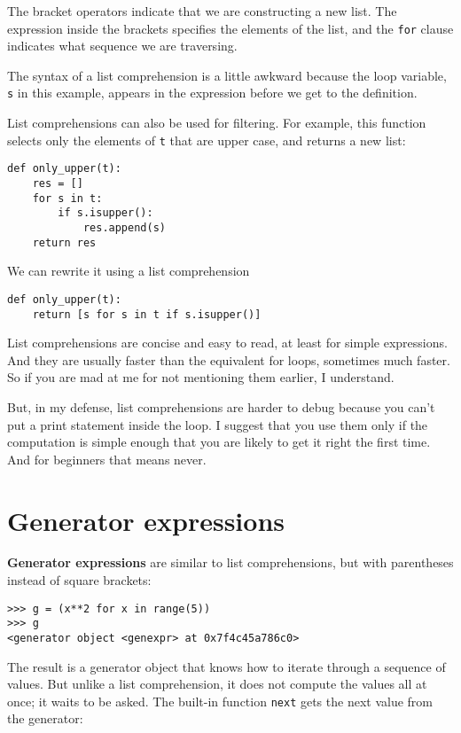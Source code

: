 \documentclass[10pt]{book}
\begin{document}
The bracket operators indicate that we are constructing a new
list.  The expression inside the brackets specifies the elements
of the list, and the {\tt for} clause indicates what sequence
we are traversing.

The syntax of a list comprehension is a little awkward because
the loop variable, {\tt s} in this example, appears in the expression
before we get to the definition.

List comprehensions can also be used for filtering.  For example,
this function selects only the elements of {\tt t} that are
upper case, and returns a new list:

\begin{verbatim}
def only_upper(t):
    res = []
    for s in t:
        if s.isupper():
            res.append(s)
    return res
\end{verbatim}

We can rewrite it using a list comprehension

\begin{verbatim}
def only_upper(t):
    return [s for s in t if s.isupper()]
\end{verbatim}

List comprehensions are concise and easy to read, at least for simple
expressions.  And they are usually faster than the equivalent for
loops, sometimes much faster.  So if you are mad at me for not
mentioning them earlier, I understand.

But, in my defense, list comprehensions are harder to debug because
you can't put a print statement inside the loop.  I suggest that you
use them only if the computation is simple enough that you are likely
to get it right the first time.  And for beginners that means never.



\section{Generator expressions}

{\bf Generator expressions} are similar to list comprehensions, but
with parentheses instead of square brackets:

\begin{verbatim}
>>> g = (x**2 for x in range(5))
>>> g
<generator object <genexpr> at 0x7f4c45a786c0>
\end{verbatim}
%
The result is a generator object that knows how to iterate through
a sequence of values.  But unlike a list comprehension, it does not
compute the values all at once; it waits to be asked.  The built-in
function {\tt next} gets the next value from the generator:
\end{document}
